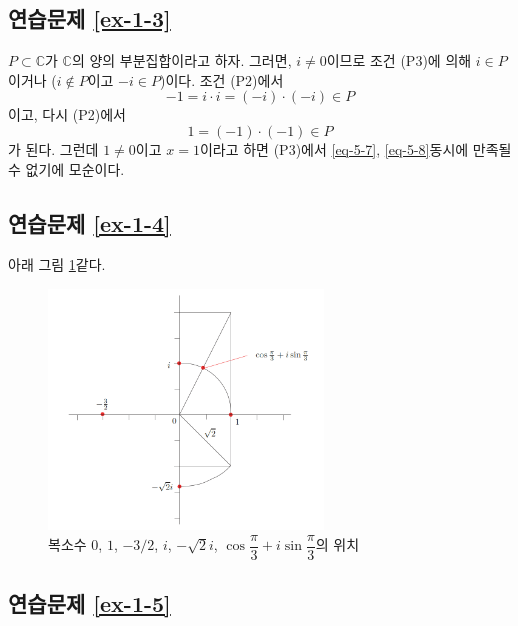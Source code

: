 \subsection*{연습문제 \ref{ex-1-3}}

$P\subset \mathbb C$가 $\mathbb C$의 양의 부분집합이라고 하자.
그러면, $i\ne0$이므로 조건 (P3)에 의해
$i\in P$이거나 ($i\not\in P$이고 $-i\in P$)이다.
조건 (P2)에서
\begin{equation}\label{eq-5-7}
-1 = i\cdot i = (-i)\cdot (-i) \in P
\end{equation}
이고, 다시 (P2)에서
\begin{equation}\label{eq-5-8}
1 = (-1)\cdot(-1) \in P
\end{equation}
가 된다. 
그런데 $1\ne0$이고
$x=1$이라고 하면 (P3)에서
\eqref{eq-5-7}, \eqref{eq-5-8}\은 동시에 만족될 수 없기에 모순이다.

\subsection*{연습문제 \ref{ex-1-4}}

아래 그림 \ref{fig-5-2}\와 같다.

\begin{figure}[h!]
\begin{center}
\includegraphics[width=0.65\textwidth]{./Solution/figs/fig-5-2}
\end{center}
\caption{복소수 $0$, $1$, $-3/2$, $i$, $-\sqrt{2}i$,
$\cos\dfrac\pi3 + i\sin\dfrac\pi3$의 위치}
\label{fig-5-2}
\end{figure}

\subsection*{연습문제 \ref{ex-1-5}}

